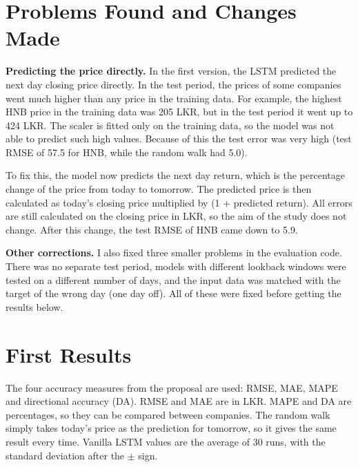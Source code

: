 \documentclass[11pt,a4paper]{article}
\begin{document}
\section{Problems Found and Changes Made}

\textbf{Predicting the price directly.} In the first version, the LSTM predicted the next
day closing price directly. In the test period, the prices of some companies went much higher
than any price in the training data. For example, the highest HNB price in the training data
was 205 LKR, but in the test period it went up to 424 LKR. The scaler is fitted only on the
training data, so the model was not able to predict such high values. Because of this the
test error was very high (test RMSE of 57.5 for HNB, while the random walk had 5.0).

To fix this, the model now predicts the next day return, which is the percentage change of
the price from today to tomorrow. The predicted price is then calculated as today's closing
price multiplied by (1 + predicted return). All errors are still calculated on the closing
price in LKR, so the aim of the study does not change. After this change, the test RMSE of
HNB came down to 5.9.

\textbf{Other corrections.} I also fixed three smaller problems in the evaluation code. There
was no separate test period, models with different lookback windows were tested on a
different number of days, and the input data was matched with the target of the wrong day
(one day off). All of these were fixed before getting the results below.

\section{First Results}

The four accuracy measures from the proposal are used: RMSE, MAE, MAPE and directional
accuracy (DA). RMSE and MAE are in LKR. MAPE and DA are percentages, so they can be compared
between companies. The random walk simply takes today's price as the prediction for tomorrow,
so it gives the same result every time. Vanilla LSTM values are the average of 30 runs, with
the standard deviation after the $\pm$ sign.
\end{document}
